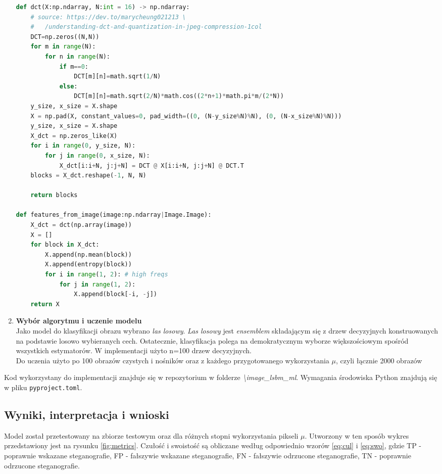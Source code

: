 \begin{enumerate}
            \begin{lstlisting}[language=Python, caption={Funkcja wykonujące transformację \textit{DCT} oraz oraz funkcja do ekstrakcji cech z pozyskanych w tenb sposób bloków}]
def dct(X:np.ndarray, N:int = 16) -> np.ndarray:
    # source: https://dev.to/marycheung021213 \
    #   /understanding-dct-and-quantization-in-jpeg-compression-1col
    DCT=np.zeros((N,N))
    for m in range(N):
        for n in range(N):
            if m==0:
                DCT[m][n]=math.sqrt(1/N)
            else:
                DCT[m][n]=math.sqrt(2/N)*math.cos((2*n+1)*math.pi*m/(2*N))
    y_size, x_size = X.shape
    X = np.pad(X, constant_values=0, pad_width=((0, (N-y_size%N)%N), (0, (N-x_size%N)%N)))
    y_size, x_size = X.shape
    X_dct = np.zeros_like(X)
    for i in range(0, y_size, N):
        for j in range(0, x_size, N):
            X_dct[i:i+N, j:j+N] = DCT @ X[i:i+N, j:j+N] @ DCT.T
    blocks = X_dct.reshape(-1, N, N)

    return blocks

def features_from_image(image:np.ndarray|Image.Image):
    X_dct = dct(np.array(image))
    X = []
    for block in X_dct:
        X.append(np.mean(block))
        X.append(entropy(block))
        for i in range(1, 2): # high freqs
            for j in range(1, 2):
                X.append(block[-i, -j])
    return X
            \end{lstlisting}

            \item \textbf{Wybór algorytmu i uczenie modelu}\\
            Jako model do klasyfikacji obrazu wybrano \textit{las losowy}. \textit{Las losowy} jest \textit{ensemblem} składającym się z drzew decyzyjnych konstruowanych na podstawie losowo wybieranych cech. Ostatecznie, klasyfikacja polega na demokratycznym wyborze większościowym spośród wszystkich estymatorów. W implementacji użyto n=100 drzew decyzyjnych.\cite{random_forest}\\
            Do uczenia użyto po 100 obrazów czystych i nośników oraz z każdego przygotowanego wykorzystania $\mu$, czyli łącznie 2000 obrazów
        \end{enumerate}
        Kod wykorzystany do implementacji znajduje się w repozytorium w folderze \textit{\textbackslash image\_lsbm\_ml}. Wymagania środowiska Python znajdują się w pliku \verb|pyproject.toml|.

    \subsection{Wyniki, interpretacja i wnioski}
    Model został przetestowany na zbiorze testowym oraz dla różnych stopni wykorzystania pikseli $\mu$. Utworzony w ten sposób wykres przedstawiony jest na rysunku \ref{fig:metrics}. Czułość i swoistość są obliczane według odpowiednio wzorów \ref{eq:cul} i \ref{eq:swo}, gdzie TP - poprawnie wskazane steganografie, FP - fałszywie wskazane steganografie, FN - fałszywie odrzucone steganografie, TN - poprawnie odrzucone steganografie.

